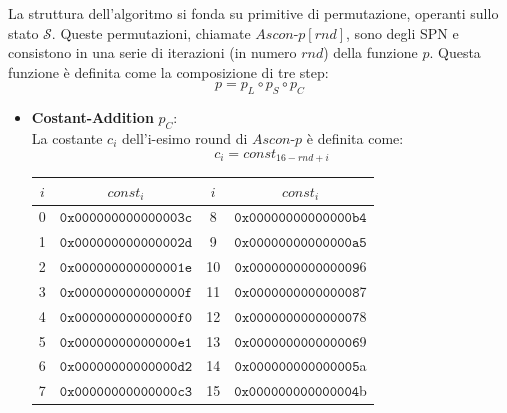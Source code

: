 \documentclass[target=bach,aauheader=,style=]{thud}
\begin{document}
			La struttura dell'algoritmo si fonda su primitive di permutazione, operanti sullo stato $\mathcal{S}$. Queste permutazioni, chiamate $Ascon$-$p[rnd]$, sono degli SPN e consistono in una serie di iterazioni (in numero $rnd$) della funzione $p$. Questa funzione è definita come la composizione di tre step:
			\[p = p_L \circ p_S \circ p_C\]
			\begin{itemize}
				\item \textbf{Costant-Addition} $p_C$:\\
				La costante $c_i$ dell'i-esimo round di $Ascon$-$p$ è definita come:
				\[c_i = const_{16-rnd+i}\]
				\begin{center}
					\begin{tabular}{|c c || c c|}
						\hline
						$i$ & $const_i$ & $i$ & $const_i$ \\
						\hline
						0 & $\mathtt{0x000000000000003c}$ & 8 & $\mathtt{0x00000000000000b4}$\\
						1 & $\mathtt{0x000000000000002d}$ & 9 & $\mathtt{0x00000000000000a5}$\\
						2 & $\mathtt{0x000000000000001e}$ & 10 &$\mathtt{ 0x000000000000009}$6\\
						3 & $\mathtt{0x000000000000000f}$ & 11 &$\mathtt{ 0x000000000000008}$7\\
						4 & $\mathtt{0x00000000000000f0}$ & 12 &$\mathtt{ 0x000000000000007}$8\\
						5 & $\mathtt{0x00000000000000e1}$ & 13 &$\mathtt{ 0x000000000000006}$9\\
						6 & $\mathtt{0x00000000000000d2}$ & 14 &$\mathtt{ 0x000000000000005}$a\\
						7 & $\mathtt{0x00000000000000c3}$ & 15 &$\mathtt{ 0x000000000000004}$b\\
						\hline
					\end{tabular}
				\end{center}
				

\end{itemize}
\end{document}
